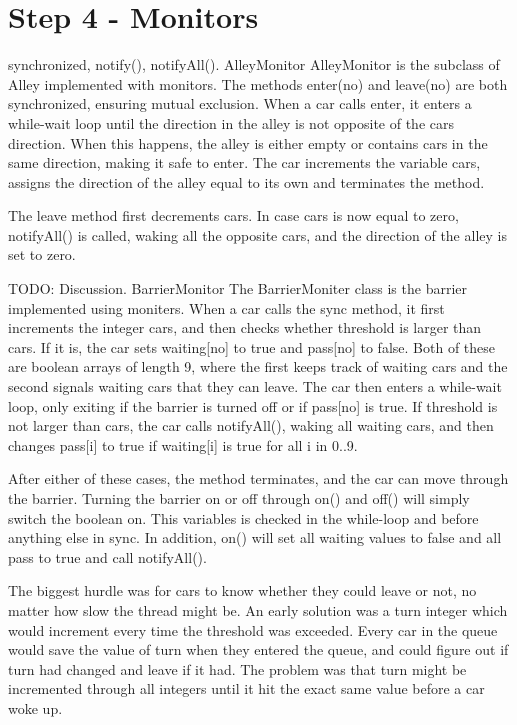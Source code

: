 \section*{Step 4 - Monitors}

synchronized, notify(), notifyAll().
AlleyMonitor
AlleyMonitor is the subclass of Alley implemented with monitors. The methods enter(no) and leave(no) are both synchronized, ensuring mutual exclusion. When a car calls enter, it enters a while-wait loop until the direction in the alley is not opposite of the cars direction. When this happens, the alley is either empty or contains cars in the same direction, making it safe to enter. The car increments the variable cars, assigns the direction of the alley equal to its own and terminates the method.

The leave method first decrements cars. In case cars is now equal to zero, notifyAll() is called, waking all the opposite cars, and the direction of the alley is set to zero.

TODO: Discussion.
BarrierMonitor
The BarrierMoniter class is the barrier implemented using moniters. When a car calls the sync method, it first increments the integer cars, and then checks whether threshold is larger than cars. If it is, the car sets waiting[no] to true and pass[no] to false. Both of these are boolean arrays of length 9, where the first keeps track of waiting cars and the second signals waiting cars that they can leave. The car then enters a while-wait loop, only exiting if the barrier is turned off or if pass[no] is true. If threshold is not larger than cars, the car calls notifyAll(), waking all waiting cars, and then changes pass[i] to true if waiting[i] is true for all i in 0..9.

After either of these cases, the method terminates, and the car can move through the barrier.
Turning the barrier on or off through on() and off() will simply switch the boolean on. This variables is checked in the while-loop and before anything else in sync. In addition, on() will set all waiting values to false and all pass to true and call notifyAll().

The biggest hurdle was for cars to know whether they could leave or not, no matter how slow the thread might be. An early solution was a turn integer which would increment every time the threshold was exceeded. Every car in the queue would save the value of turn when they entered the queue, and could figure out if turn had changed and leave if it had. The problem was that turn might be incremented through all integers until it hit the exact same value before a car woke up.

